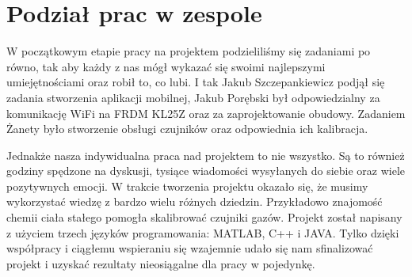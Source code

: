 \documentclass[12pt,a4paper]{article}
\begin{document}
\section{Podział prac w zespole}

W początkowym etapie pracy na projektem podzieliliśmy się zadaniami po równo, tak aby każdy z nas mógł wykazać się swoimi najlepszymi umiejętnościami oraz robił to, co lubi. I tak Jakub Szczepankiewicz podjął się zadania stworzenia aplikacji mobilnej, Jakub Porębski był odpowiedzialny za komunikację WiFi na FRDM KL25Z oraz za zaprojektowanie obudowy. Zadaniem Żanety było stworzenie obsługi czujników oraz odpowiednia ich kalibracja.

Jednakże nasza indywidualna praca nad projektem to nie wszystko. Są to również godziny spędzone na dyskusji, tysiące wiadomości wysyłanych do siebie oraz wiele pozytywnych emocji. W trakcie tworzenia projektu okazało się, że musimy wykorzystać wiedzę z bardzo wielu różnych dziedzin. Przykładowo znajomość chemii ciała stałego pomogła skalibrować czujniki gazów. Projekt został napisany z użyciem trzech języków programowania: \mbox{MATLAB}, C++ i JAVA. Tylko dzięki współpracy i ciągłemu wspieraniu się wzajemnie udało się nam sfinalizować projekt i uzyskać  rezultaty nieosiągalne dla pracy w pojedynkę.







\end{document}
